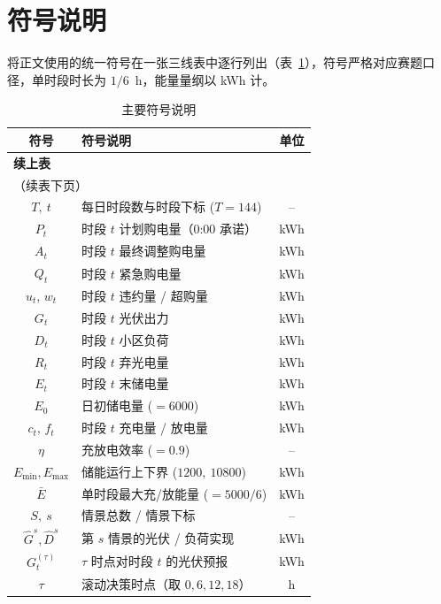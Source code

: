 \documentclass[withoutpreface]{cumcmthesis}
\begin{document}
\section{符号说明}
将正文使用的统一符号在一张三线表中逐行列出（表~\ref{tab:symbol}），符号严格对应赛题口径，单时段时长为 $1/6$~h，能量量纲以 kWh 计。
\renewcommand{\arraystretch}{1.0}
\begin{footnotesize}
\begin{longtable}{clc}
    \caption{主要符号说明}\label{tab:symbol}\\
    \toprule[0.8pt]
    \textbf{符号} & \textbf{符号说明} & \textbf{单位} \\
    \midrule[0.5pt]
    \endfirsthead
    \multicolumn{3}{l}{\bfseries 续上表}\\[-4pt]
    \midrule[0.5pt]
    \endhead
    \multicolumn{3}{l}{（续表下页）}\\
    \bottomrule[0.8pt]
    \endfoot
    \bottomrule[0.8pt]
    \endlastfoot
        $T,\ t$ & 每日时段数与时段下标 ($T=144$) & -- \\
        $P_t$ & 时段 $t$ 计划购电量（0:00 承诺） & kWh \\
        $A_t$ & 时段 $t$ 最终调整购电量 & kWh \\
        $Q_t$ & 时段 $t$ 紧急购电量 & kWh \\
        $u_t,\,w_t$ & 时段 $t$ 违约量 / 超购量 & kWh \\
        $G_t$ & 时段 $t$ 光伏出力 & kWh \\
        $D_t$ & 时段 $t$ 小区负荷 & kWh \\
        $R_t$ & 时段 $t$ 弃光电量 & kWh \\
        $E_t$ & 时段 $t$ 末储电量 & kWh \\
        $E_0$ & 日初储电量 ($=6000$) & kWh \\
        $c_t,\,f_t$ & 时段 $t$ 充电量 / 放电量 & kWh \\
        $\eta$ & 充放电效率 ($=0.9$) & -- \\
        $E_{\min},E_{\max}$ & 储能运行上下界 ($1200,\ 10800$) & kWh \\
        $\bar{E}$ & 单时段最大充/放能量 ($=5000/6$) & kWh \\
        $S,\ s$ & 情景总数 / 情景下标 & -- \\
        $\hat G^s,\hat D^s$ & 第 $s$ 情景的光伏 / 负荷实现 & kWh \\
        $G_t^{(\tau)}$ & $\tau$ 时点对时段 $t$ 的光伏预报 & kWh \\
        $\tau$ & 滚动决策时点（取 $0,6,12,18$） & h \\

\end{longtable}
\end{footnotesize}
\end{document}
